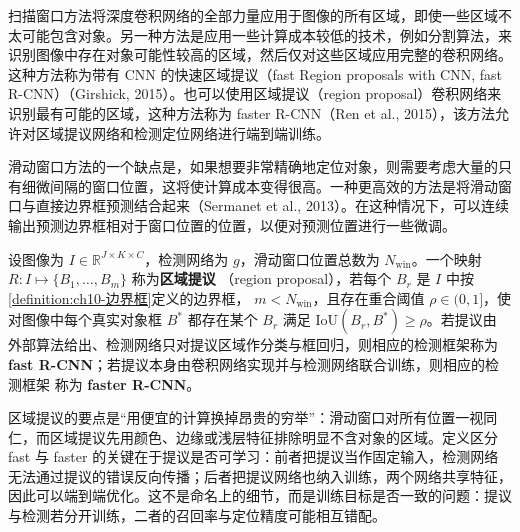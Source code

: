 \documentclass[../../main.tex]{subfiles}
\begin{document}
扫描窗口方法将深度卷积网络的全部力量应用于图像的所有区域，即使一些区域不太可能包含对象。另一种方法是应用一些计算成本较低的技术，例如分割算法，来识别图像中存在对象可能性较高的区域，然后仅对这些区域应用完整的卷积网络。这种方法称为带有 CNN 的快速区域提议（fast Region proposals with CNN, fast R-CNN）（Girshick, 2015）。也可以使用区域提议（region proposal）卷积网络来识别最有可能的区域，这种方法称为 faster R-CNN（Ren et al., 2015），该方法允许对区域提议网络和检测定位网络进行端到端训练。

滑动窗口方法的一个缺点是，如果想要非常精确地定位对象，则需要考虑大量的只有细微间隔的窗口位置，这将使计算成本变得很高。一种更高效的方法是将滑动窗口与直接边界框预测结合起来（Sermanet et al., 2013）。在这种情况下，可以连续输出预测边界框相对于窗口位置的位置，以便对预测位置进行一些微调。

\begin{definition}[区域提议]\label{definition:ch10-区域提议}
设图像为 $I\in\mathbb{R}^{J\times K\times C}$，检测网络为 $g$，滑动窗口位置总数为
$N_{\mathrm{win}}$。一个映射 $R:I\mapsto\{B_1,\dots,B_m\}$ 称为\textbf{区域提议}
（region proposal），若每个 $B_r$ 是 $I$ 中按\cref{definition:ch10-边界框}定义的边界框，
$m<N_{\mathrm{win}}$，且存在重合阈值 $\rho\in(0,1]$，使对图像中每个真实对象框
$B^{\ast}$ 都存在某个 $B_r$ 满足 $\mathrm{IoU}(B_r,B^{\ast})\geqslant\rho$。若提议由
外部算法给出、检测网络只对提议区域作分类与框回归，则相应的检测框架称为
\textbf{fast R-CNN}；若提议本身由卷积网络实现并与检测网络联合训练，则相应的检测框架
称为 \textbf{faster R-CNN}。
\end{definition}

\begin{remark}
区域提议的要点是“用便宜的计算换掉昂贵的穷举”：滑动窗口对所有位置一视同仁，而区域提议先用颜色、边缘或浅层特征排除明显不含对象的区域。定义区分 fast 与 faster 的关键在于提议是否可学习：前者把提议当作固定输入，检测网络无法通过提议的错误反向传播；后者把提议网络也纳入训练，两个网络共享特征，因此可以端到端优化。这不是命名上的细节，而是训练目标是否一致的问题：提议与检测若分开训练，二者的召回率与定位精度可能相互错配。
\end{remark}
\end{document}
